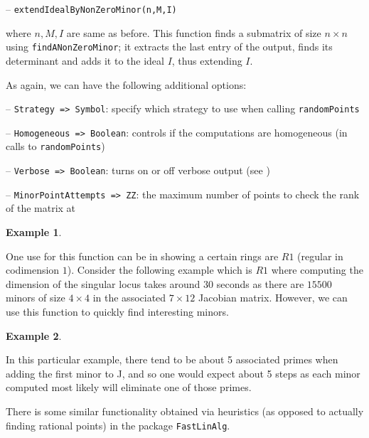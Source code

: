 \documentclass[11pt]{amsart}
\theoremstyle{definition}
\newtheorem{example}{Example}[section]
\begin{document}
\vspace{1em}
-- {\tt extendIdealByNonZeroMinor(n,M,I)} 

\vspace{1em}
\noindent where $n,M,I$ are same as before. This function finds a submatrix of size $n\times n$ using {\tt findANonZeroMinor};  
it extracts the last entry of the output, finds its determinant and
adds it to the ideal $I$, thus extending $I$. 


As again, we can have the following additional options:

\vspace{1em}
-- {\tt Strategy => Symbol}: specify which strategy to use when calling {\tt randomPoints}

-- {\tt Homogeneous => Boolean}: controls if the computations are homogeneous (in calls to {\tt randomPoints})


-- {\tt Verbose => Boolean}: turns on or off verbose output (see )

-- {\tt MinorPointAttempts => ZZ}: the maximum number of points to check the rank of the matrix at    

  

\begin{example}
	
\end{example}

One use for this function can be in showing a certain rings are $R1$ (regular in codimension $1$).
Consider the following example which is $R1$ where computing the dimension of the singular locus takes around $30$ seconds as there are $15500$ minors of size $4 \times 4$ in the associated $7 \times 12$ Jacobian matrix.  However, we can use this function to quickly find interesting minors.
\begin{example}
	
	\end{example} 

In this particular example, there tend to be about 5 associated primes when adding the first minor to J, and so one would expect about 5 steps as each minor computed most likely will eliminate one of those primes.

There is some similar functionality obtained via heuristics (as opposed to actually finding rational points) in the package {\tt FastLinAlg}.


\vspace{2em}
\end{document}
